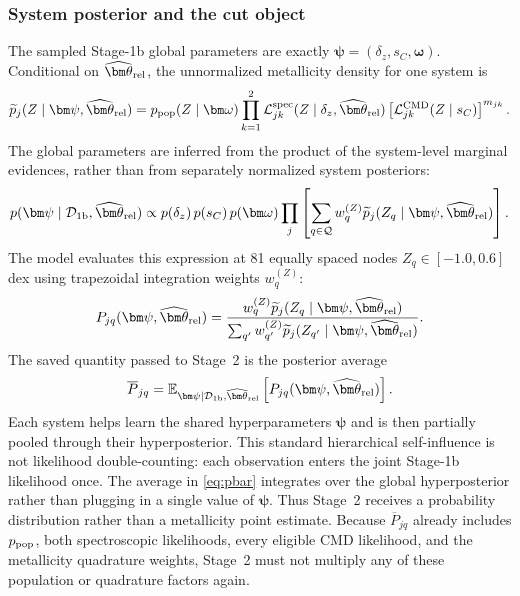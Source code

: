 \subsubsection{System posterior and the cut object}

The sampled Stage-1b global parameters are exactly
$\bm\psi=(\delta_z,s_C,\bm\omega)$.  Conditional on
$\widehat{\bm\theta}_{\rm rel}$, the unnormalized metallicity density for one
system is
\begin{equation}
 \widetilde p_j(Z\mid\bm\psi,\widehat{\bm\theta}_{\rm rel})
 =p_{\rm pop}(Z\mid\bm\omega)
 \prod_{k=1}^{2}\mathcal{L}^{\rm spec}_{jk}
 (Z\mid\delta_z,\widehat{\bm\theta}_{\rm rel})
 \left[\mathcal{L}^{\rm CMD}_{jk}(Z\mid s_C)\right]^{m_{jk}}.
 \label{eq:zpost-cont}
\end{equation}
The global parameters are inferred from the product of the system-level
marginal evidences, rather than from separately normalized system posteriors:
\begin{equation}
 p(\bm\psi\mid\mathcal D_{\rm 1b},\widehat{\bm\theta}_{\rm rel})\propto
 p(\delta_z)\,p(s_C)\,p(\bm\omega)
 \prod_j\left[\sum_{q\in\mathcal Q}w_q^{(Z)}
 \widetilde p_j(Z_q\mid\bm\psi,\widehat{\bm\theta}_{\rm rel})\right].
 \label{eq:stage1-global}
\end{equation}
The model evaluates this expression at 81 equally spaced nodes
$Z_q\in[-1.0,0.6]$ dex using trapezoidal integration weights $w_q^{(Z)}$:
\begin{equation}
 P_{jq}(\bm\psi,\widehat{\bm\theta}_{\rm rel})=
 \frac{w_q^{(Z)}\widetilde p_j
 (Z_q\mid\bm\psi,\widehat{\bm\theta}_{\rm rel})}
 {\sum_{q'}w_{q'}^{(Z)}\widetilde p_j
 (Z_{q'}\mid\bm\psi,\widehat{\bm\theta}_{\rm rel})}.
\end{equation}
The saved quantity passed to Stage~2 is the posterior average
\begin{equation}
 \overline P_{jq}=\mathbb E_{\bm\psi\mid\mathcal D_{\rm 1b},
 \widehat{\bm\theta}_{\rm rel}}
 \left[P_{jq}(\bm\psi,\widehat{\bm\theta}_{\rm rel})\right].
 \label{eq:pbar}
\end{equation}
Each system helps learn the shared hyperparameters $\bm\psi$ and is then
partially pooled through their hyperposterior.  This standard hierarchical
self-influence is not likelihood double-counting: each observation enters the
joint Stage-1b likelihood once.  The average in \cref{eq:pbar} integrates over
the global hyperposterior rather than plugging in a single value of
$\bm\psi$.  Thus Stage~2 receives a probability distribution rather than a
metallicity point estimate.  Because $\overline P_{jq}$ already includes
$p_{\rm pop}$, both spectroscopic likelihoods, every eligible CMD likelihood,
and the metallicity quadrature weights, Stage~2 must not multiply any of these
population or quadrature factors again.

